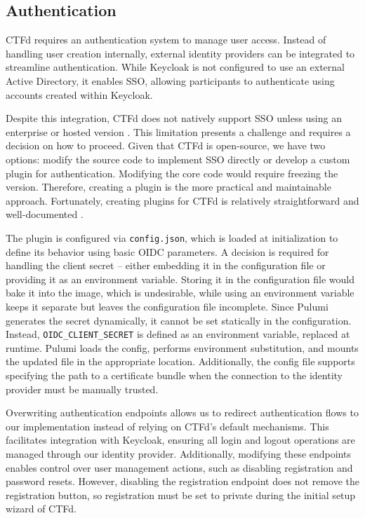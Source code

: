 \subsection{Authentication}

CTFd requires an authentication system to manage user access. Instead of handling user creation internally, external identity providers can be integrated to streamline authentication. While Keycloak is not configured to use an external Active Directory, it enables SSO, allowing participants to authenticate using accounts created within Keycloak.

Despite this integration, CTFd does not natively support SSO unless using an enterprise or hosted version \parencite{ctfd_sso}. This limitation presents a challenge and requires a decision on how to proceed. Given that CTFd is open-source, we have two options: modify the source code to implement SSO directly or develop a custom plugin for authentication. Modifying the core code would require freezing the version. Therefore, creating a plugin is the more practical and maintainable approach. Fortunately, creating plugins for CTFd is relatively straightforward and well-documented \parencite{ctfd_plugins}. 

The plugin is configured via \texttt{config.json}, which is loaded at initialization to define its behavior using basic OIDC parameters. A decision is required for handling the client secret -- either embedding it in the configuration file or providing it as an environment variable. Storing it in the configuration file would bake it into the image, which is undesirable, while using an environment variable keeps it separate but leaves the configuration file incomplete. Since Pulumi generates the secret dynamically, it cannot be set statically in the configuration. Instead, \texttt{OIDC\_CLIENT\_SECRET} is defined as an environment variable, replaced at runtime. Pulumi loads the config, performs environment substitution, and mounts the updated file in the appropriate location. Additionally, the config file supports specifying the path to a certificate bundle when the connection to the identity provider must be manually trusted.

Overwriting authentication endpoints allows us to redirect authentication flows to our implementation instead of relying on CTFd's default mechanisms. This facilitates integration with Keycloak, ensuring all login and logout operations are managed through our identity provider. Additionally, modifying these endpoints enables control over user management actions, such as disabling registration and password resets. However, disabling the registration endpoint does not remove the registration button, so registration must be set to private during the initial setup wizard of CTFd.

